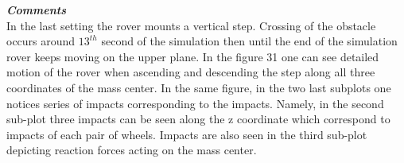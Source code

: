\noindent \textbf{\textit{\Large{Comments}}}\\[1mm]
\noindent In the last setting the rover mounts a vertical step. Crossing of the obstacle occurs around $13^{th}$ second of the simulation then until the end of the simulation rover keeps moving on the upper plane. 
In the figure 31 one can see detailed motion of the rover when ascending and descending the step along all three coordinates of the mass center.
In the same figure, in the two last subplots one notices series of impacts corresponding to the impacts. Namely, in the second sub-plot three impacts can be seen along the z coordinate which correspond to impacts of each pair of
wheels. Impacts are also seen in the third sub-plot depicting reaction forces acting on the mass center. 

